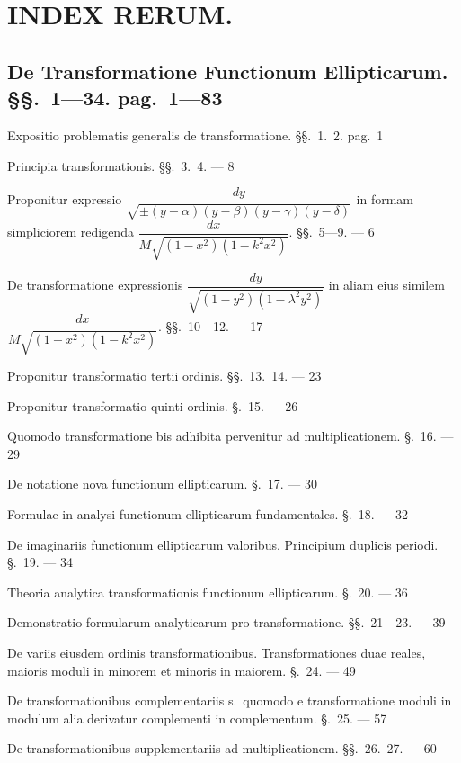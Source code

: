 \documentclass{article}
\begin{document}

\section*{INDEX RERUM.}

\subsection*{De Transformatione Functionum Ellipticarum. §§.\ 1---34. pag.\ 1---83}

Expositio problematis generalis de transformatione. §§.\ 1.\ 2. pag.\ 1

Principia transformationis. §§.\ 3.\ 4. --- 8

Proponitur expressio $\dfrac{dy}{\sqrt{\pm(y-\alpha)(y-\beta)(y-\gamma)(y-\delta)}}$ in formam simpliciorem redigenda $\dfrac{dx}{M\sqrt{(1-x^{2})(1-k^{2}x^{2})}}$. §§.\ 5---9. --- 6

De transformatione expressionis $\dfrac{dy}{\sqrt{(1-y^{2})(1-\lambda^{2}y^{2})}}$ in aliam eius similem $\dfrac{dx}{M\sqrt{(1-x^{2})(1-k^{2}x^{2})}}$. §§.\ 10---12. --- 17

Proponitur transformatio tertii ordinis. §§.\ 13.\ 14. --- 23

Proponitur transformatio quinti ordinis. §.\ 15. --- 26

Quomodo transformatione bis adhibita pervenitur ad multiplicationem. §.\ 16. --- 29

De notatione nova functionum ellipticarum. §.\ 17. --- 30

Formulae in analysi functionum ellipticarum fundamentales. §.\ 18. --- 32

De imaginariis functionum ellipticarum valoribus. Principium duplicis periodi. §.\ 19. --- 34

Theoria analytica transformationis functionum ellipticarum. §.\ 20. --- 36

Demonstratio formularum analyticarum pro transformatione. §§.\ 21---23. --- 39

De variis eiusdem ordinis transformationibus. Transformationes duae reales, maioris moduli in minorem et minoris in maiorem. §.\ 24. --- 49

De transformationibus complementariis s.\ quomodo e transformatione moduli in modulum alia derivatur complementi in complementum. §.\ 25. --- 57

De transformationibus supplementariis ad multiplicationem. §§.\ 26.\ 27. --- 60
\end{document}
